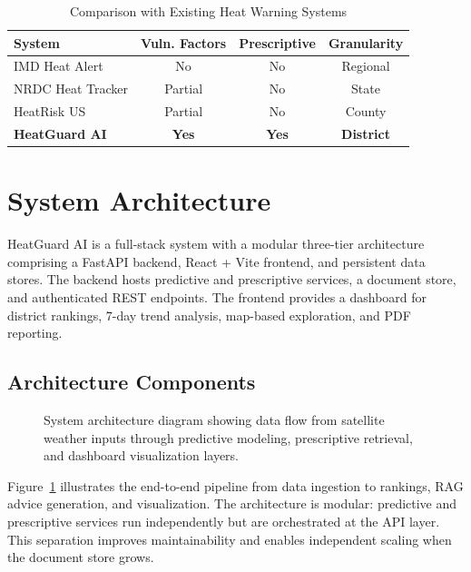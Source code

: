 \documentclass[conference]{IEEEtran}
\begin{document}
\begin{table}[htbp]
\centering
\caption{Comparison with Existing Heat Warning Systems}
\begin{tabular}{@{}lccc@{}}
\toprule
\textbf{System} & \textbf{Vuln. Factors} & \textbf{Prescriptive} & \textbf{Granularity} \\
\midrule
IMD Heat Alert & No & No & Regional \\
NRDC Heat Tracker & Partial & No & State \\
HeatRisk US & Partial & No & County \\
\textbf{HeatGuard AI} & \textbf{Yes} & \textbf{Yes} & \textbf{District} \\
\bottomrule
\end{tabular}
\label{tab:comparison}
\end{table}

\section{System Architecture}
\label{sec:architecture}

HeatGuard AI is a full-stack system with a modular three-tier architecture comprising a FastAPI backend, React + Vite frontend, and persistent data stores. The backend hosts predictive and prescriptive services, a document store, and authenticated REST endpoints. The frontend provides a dashboard for district rankings, 7-day trend analysis, map-based exploration, and PDF reporting.

\subsection{Architecture Components}

\begin{figure}[htbp]
    \centering
    \fbox{\rule{0pt}{2.5in}\rule{0.95\textwidth}{0pt}}
    \caption{System architecture diagram showing data flow from satellite weather inputs through predictive modeling, prescriptive retrieval, and dashboard visualization layers.}
    \label{fig:architecture}
\end{figure}

Figure~\ref{fig:architecture} illustrates the end-to-end pipeline from data ingestion to rankings, RAG advice generation, and visualization. The architecture is modular: predictive and prescriptive services run independently but are orchestrated at the API layer. This separation improves maintainability and enables independent scaling when the document store grows.
\end{document}

